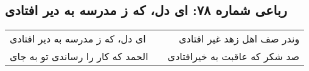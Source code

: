 \begin{center}
\section*{رباعی شماره ۷۸: ای دل، که ز مدرسه به دیر افتادی}
\label{sec:078}
\begin{longtable}{l p{0.5cm} r}
ای دل، که ز مدرسه به دیر افتادی
&&
وندر صف اهل زهد غیر افتادی
\\
الحمد که کار را رساندی تو به جای
&&
صد شکر که عاقبت به خیرافتادی
\\
\end{longtable}
\end{center}
